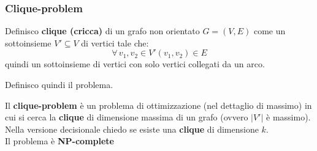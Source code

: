 \documentclass[a4paper,12pt, oneside]{book}
\begin{document}
\subsubsection{Clique-problem}
\begin{definizione}
  Definisco \textbf{clique (\textup{cricca})} di un grafo non orientato
  $G=(V,E)$ come un sottoinsieme $V'\subseteq V$ di vertici tale che:
  \[\forall \,v_1,v_2\in V' (v_1,v_2)\in E\]
  quindi un sottoinsieme di vertici con solo vertici collegati da un arco.
\end{definizione}
Definisco quindi il problema.
\begin{definizione}
  Il \textbf{clique-problem} è un problema di ottimizzazione (nel
  dettaglio di massimo) in cui si cerca la \textbf{clique} di dimensione massima
  di un grafo (ovvero $|V'|$ è massimo). Nella versione decisionale chiedo se
  esiste una \textbf{clique} di dimensione $k$.\\
  Il problema è \textbf{NP-complete}
\end{definizione}
\end{document}
